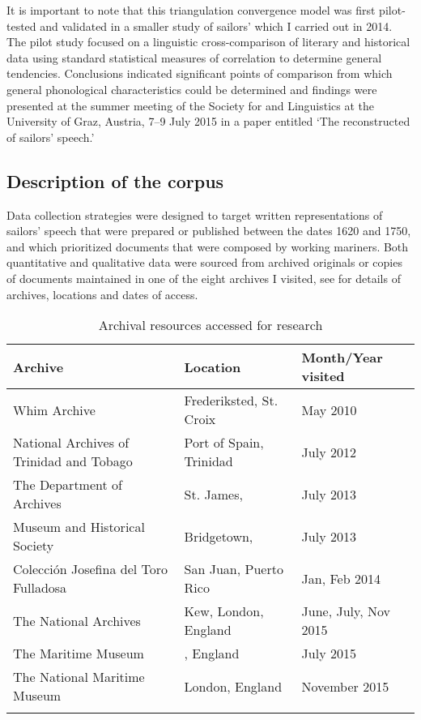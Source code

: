 It is important to note that this triangulation convergence model was first pilot-tested and validated in a smaller study of sailors’  which I carried out in 2014. The pilot study focused on a linguistic cross-comparison of literary and historical data using standard statistical measures of correlation to determine general tendencies. Conclusions indicated significant points of comparison from which general phonological characteristics could be determined and findings were presented at the summer meeting of the Society for  and  Linguistics at the University of Graz, Austria, 7–9 July {2015} in a paper entitled ‘The reconstructed  of  sailors’ speech.’



\subsection{{Description of the corpus}}\label{sec:1.3.2}



Data collection strategies were designed to target written representations of sailors’ speech that were prepared or published between the dates 1620 and 1750, and which prioritized documents that were composed by working mariners. Both quantitative and qualitative data were sourced from archived originals or copies of documents maintained in one of the eight archives I visited, see  for details of archives, locations and dates of access.


\begin{table}\begin{tabularx}{\textwidth}{Qll}
\lsptoprule

\textbf{Archive} & \textbf{Location} & \textbf{Month/Year} \textbf{visited}\\
\midrule 
Whim Archive & Frederiksted, St. Croix &  {May 2010}\\
\tablevspace
National Archives of Trinidad and Tobago & Port of Spain, Trinidad &  {July 2012}\\
\tablevspace
The  Department of Archives & St. James,  &  {July 2013}\\
\tablevspace
{} Museum and Historical Society & Bridgetown,  &  {July 2013}\\
\tablevspace
Colección Josefina del Toro Fulladosa & San Juan, Puerto Rico & Jan,  {Feb 2014}\\
\tablevspace
The National Archives & Kew, London, England & June, July,  {Nov 2015}\\
\tablevspace
The  Maritime Museum & , England &  {July 2015}\\
\tablevspace
The National Maritime Museum & London, England &  {November 2015}\\
\lspbottomrule
\end{tabularx}

\caption{\label{tab:key:1.1} Archival resources accessed for research}
\end{table}



